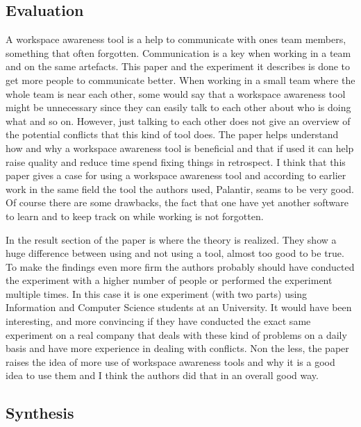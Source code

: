 \documentclass[a4paper]{article}
\begin{document}
\subsection*{Evaluation}
A workspace awareness tool is a help to communicate with ones team members, something that often forgotten. Communication is a key when working in a team and on the same artefacts. This paper and the experiment it describes is done to get more people to communicate better. When working in a small team where the whole team is near each other, some would say that a workspace awareness tool might be unnecessary since they can easily talk to each other about who is doing what and so on. However, just talking to each other does not give an overview of the potential conflicts that this kind of tool does. The paper helps understand how and why a workspace awareness tool is beneficial and that if used it can help raise quality and reduce time spend fixing things in retrospect.
I think that this paper gives a case for using a workspace awareness tool and according to earlier work in the same field the tool the authors used, Palantir, seams to be very good. Of course there are some drawbacks, the fact that one have yet another software to learn and to keep track on while working is not forgotten.

In the result section of the paper is where the theory is realized. They show a huge difference between using and not using a tool, almost too good to be true. To make the findings even more firm the authors probably should have conducted the experiment with a higher number of people or performed the experiment multiple times. In this case it is one experiment (with two parts) using Information and Computer Science students at an University. It would have been interesting, and more convincing if they have conducted the exact same experiment on a real company that deals with these kind of problems on a daily basis and have more experience in dealing with conflicts. Non the less, the paper raises the idea of more use of workspace awareness tools and why it is a good idea to use them and I think the authors did that in an overall good way.


\subsection*{Synthesis}
\end{document}
